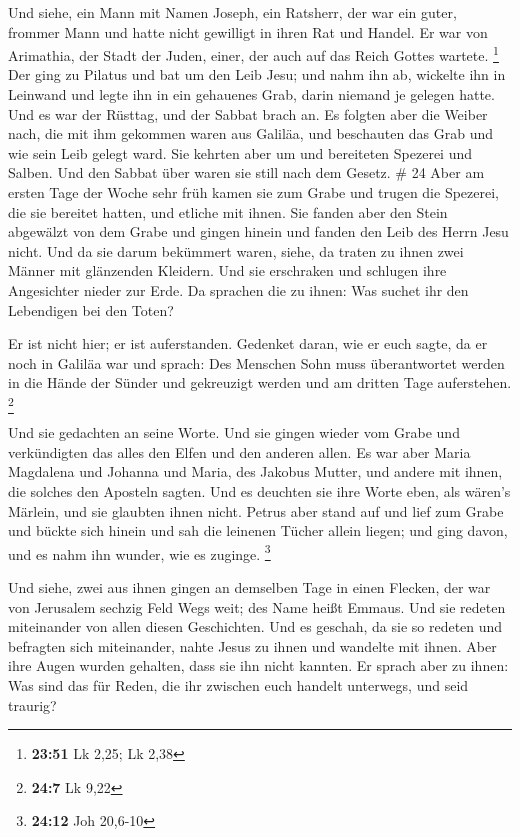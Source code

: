  Und siehe, ein Mann mit Namen Joseph, ein Ratsherr, der
war ein guter, frommer Mann  und hatte nicht gewilligt in
ihren Rat und Handel. Er war von Arimathia, der Stadt der Juden, einer,
der auch auf das Reich Gottes wartete. \footnote{\textbf{23:51} Lk 2,25;
  Lk 2,38}  Der ging zu Pilatus und bat um den Leib Jesu;
 und nahm ihn ab, wickelte ihn in Leinwand und legte ihn
in ein gehauenes Grab, darin niemand je gelegen hatte. 
Und es war der Rüsttag, und der Sabbat brach an.  Es
folgten aber die Weiber nach, die mit ihm gekommen waren aus Galiläa,
und beschauten das Grab und wie sein Leib gelegt ward. 
Sie kehrten aber um und bereiteten Spezerei und Salben. Und den Sabbat
über waren sie still nach dem Gesetz. \# 24  Aber am
ersten Tage der Woche sehr früh kamen sie zum Grabe und trugen die
Spezerei, die sie bereitet hatten, und etliche mit ihnen. 
Sie fanden aber den Stein abgewälzt von dem Grabe  und
gingen hinein und fanden den Leib des Herrn Jesu nicht. 
Und da sie darum bekümmert waren, siehe, da traten zu ihnen zwei Männer
mit glänzenden Kleidern.  Und sie erschraken und schlugen
ihre Angesichter nieder zur Erde. Da sprachen die zu ihnen: Was suchet
ihr den Lebendigen bei den Toten?

 Er ist nicht hier; er ist auferstanden. Gedenket daran,
wie er euch sagte, da er noch in Galiläa war  und sprach:
Des Menschen Sohn muss überantwortet werden in die Hände der Sünder und
gekreuzigt werden und am dritten Tage auferstehen. \footnote{\textbf{24:7}
  Lk 9,22}

 Und sie gedachten an seine Worte.  Und sie
gingen wieder vom Grabe und verkündigten das alles den Elfen und den
anderen allen.  Es war aber Maria Magdalena und Johanna
und Maria, des Jakobus Mutter, und andere mit ihnen, die solches den
Aposteln sagten.  Und es deuchten sie ihre Worte eben,
als wären's Märlein, und sie glaubten ihnen nicht. 
Petrus aber stand auf und lief zum Grabe und bückte sich hinein und sah
die leinenen Tücher allein liegen; und ging davon, und es nahm ihn
wunder, wie es zuginge. \footnote{\textbf{24:12} Joh 20,6-10}

 Und siehe, zwei aus ihnen gingen an demselben Tage in
einen Flecken, der war von Jerusalem sechzig Feld Wegs weit; des Name
heißt Emmaus.  Und sie redeten miteinander von allen
diesen Geschichten.  Und es geschah, da sie so redeten
und befragten sich miteinander, nahte Jesus zu ihnen und wandelte mit
ihnen.  Aber ihre Augen wurden gehalten, dass sie ihn
nicht kannten.  Er sprach aber zu ihnen: Was sind das für
Reden, die ihr zwischen euch handelt unterwegs, und seid traurig?

